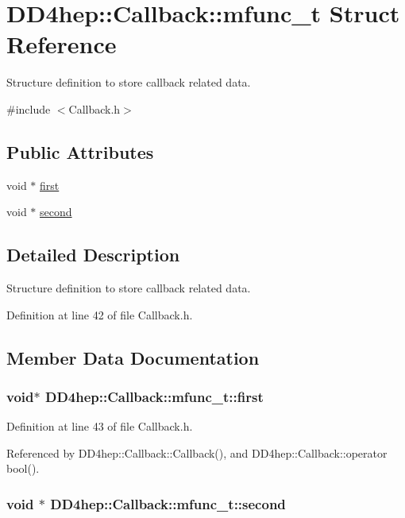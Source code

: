 \hypertarget{struct_d_d4hep_1_1_callback_1_1mfunc__t}{
\section{DD4hep::Callback::mfunc\_\-t Struct Reference}
\label{struct_d_d4hep_1_1_callback_1_1mfunc__t}
}


Structure definition to store callback related data.  


{\ttfamily \#include $<$Callback.h$>$}\subsection*{Public Attributes}
\begin{DoxyCompactItemize}
\item 
void $\ast$ \hyperlink{struct_d_d4hep_1_1_callback_1_1mfunc__t_aa42e9aa800dd766438a6097fad5126fd}{first}
\item 
void $\ast$ \hyperlink{struct_d_d4hep_1_1_callback_1_1mfunc__t_a510bbd3c9df48a5a950c9b7e4ea9eadc}{second}
\end{DoxyCompactItemize}


\subsection{Detailed Description}
Structure definition to store callback related data. 

Definition at line 42 of file Callback.h.

\subsection{Member Data Documentation}
\hypertarget{struct_d_d4hep_1_1_callback_1_1mfunc__t_aa42e9aa800dd766438a6097fad5126fd}{
\subsubsection[{first}]{\setlength{\rightskip}{0pt plus 5cm}void$\ast$ {\bf DD4hep::Callback::mfunc\_\-t::first}}}
\label{struct_d_d4hep_1_1_callback_1_1mfunc__t_aa42e9aa800dd766438a6097fad5126fd}


Definition at line 43 of file Callback.h.

Referenced by DD4hep::Callback::Callback(), and DD4hep::Callback::operator bool().\hypertarget{struct_d_d4hep_1_1_callback_1_1mfunc__t_a510bbd3c9df48a5a950c9b7e4ea9eadc}{
\subsubsection[{second}]{\setlength{\rightskip}{0pt plus 5cm}void $\ast$ {\bf DD4hep::Callback::mfunc\_\-t::second}}}
\label{struct_d_d4hep_1_1_callback_1_1mfunc__t_a510bbd3c9df48a5a950c9b7e4ea9eadc}


